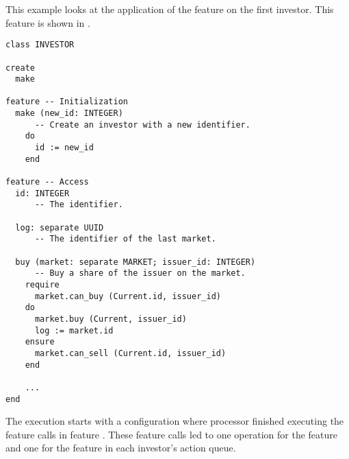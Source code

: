 \begin{fortechnicalreport}
\newpage
\begin{example}
This example looks at the application of the feature  on the first investor. This feature is shown in .

\begin{lstlisting}[caption=Investor class, label=lst:investor class, language=SCOOP]
class INVESTOR

create
  make
	
feature -- Initialization
  make (new_id: INTEGER)
      -- Create an investor with a new identifier.
    do
      id := new_id
    end
		
feature -- Access
  id: INTEGER
      -- The identifier.
	
  log: separate UUID
      -- The identifier of the last market.

  buy (market: separate MARKET; issuer_id: INTEGER)
      -- Buy a share of the issuer on the market.
    require
      market.can_buy (Current.id, issuer_id)
    do
      market.buy (Current, issuer_id)
      log := market.id
    ensure
      market.can_sell (Current.id, issuer_id)
    end

    ...		
end
\end{lstlisting}

The execution starts with a configuration where processor  finished executing the feature calls in feature . These feature calls led to one  operation for the  feature and one for the  feature in each investor's action queue.


\end{example}
\end{fortechnicalreport}
